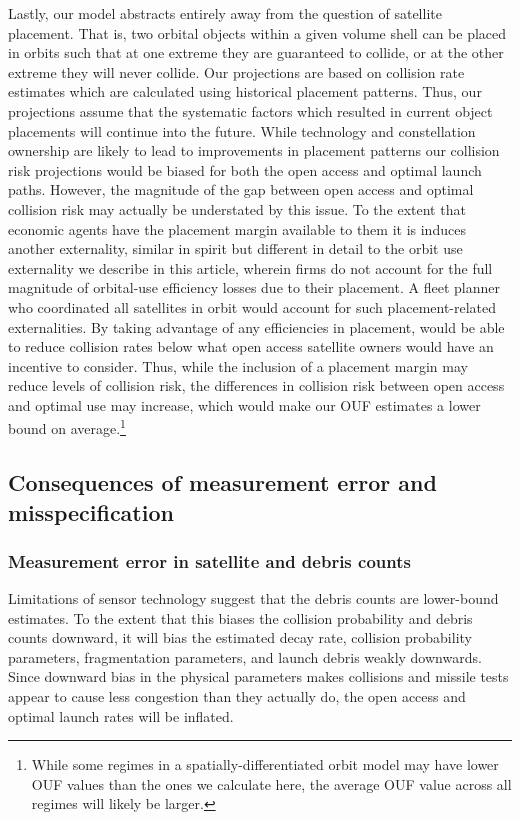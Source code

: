 \documentclass[9pt,twoside,lineno]{pnas-new}
\begin{document}
Lastly, our model abstracts entirely away from the question of satellite placement. That is, two orbital objects within a given volume shell can be placed in orbits such that at one extreme they are guaranteed to collide, or at the other extreme they will never collide. Our projections are based on collision rate estimates which are calculated using historical placement patterns. Thus, our projections assume that the systematic factors which resulted in current object placements will continue into the future. While technology and constellation ownership are likely to lead to improvements in placement patterns our collision risk projections would be biased for both the open access and optimal launch paths. However, the magnitude of the gap between open access and optimal collision risk may actually be understated by this issue. To the extent that economic agents have the placement margin available to them it is induces another externality, similar in spirit but different in detail to the orbit use externality we describe in this article, wherein firms do not account for the full magnitude of orbital-use efficiency losses due to their placement. A fleet planner who coordinated all satellites in orbit would account for such placement-related externalities. By taking advantage of any efficiencies in placement, would be able to reduce collision rates below what open access satellite owners would have an incentive to consider. Thus, while the inclusion of a placement margin may reduce levels of collision risk, the differences in collision risk between open access and optimal use may increase, which would make our OUF estimates a lower bound on average.\footnote{While some regimes in a spatially-differentiated orbit model may have lower OUF values than the ones we calculate here, the average OUF value across all regimes will likely be larger.}


\subsection{Consequences of measurement error and misspecification}

\subsubsection{Measurement error in satellite and debris counts}
\label{physicsMeasurementError}

Limitations of sensor technology suggest that the debris counts are lower-bound estimates. To the extent that this biases the collision probability and debris counts downward, it will bias the estimated decay rate, collision probability parameters, fragmentation parameters, and launch debris weakly downwards. Since downward bias in the physical parameters makes collisions and missile tests appear to cause less congestion than they actually do, the open access and optimal launch rates will be inflated.\\
\end{document}
